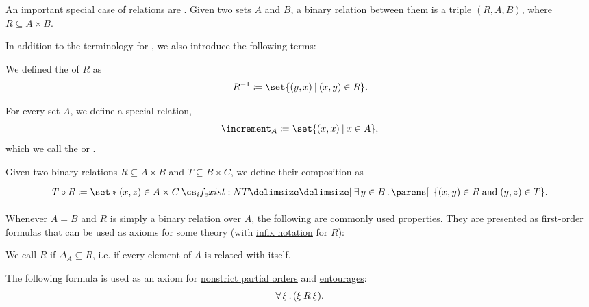 \begin{definition}\label{def:binary_relation}
  An important special case of \hyperref[def:relation]{relations} are . Given two sets \( A \) and \( B \), a binary relation between them is a triple \( (R, A, B) \), where \( R \subseteq A \times B \).

  In addition to the terminology for , we also introduce the following terms:
  \begin{thmenum}[series=def:binary_relation]
     We defined the  of \( R \) as
    \begin{equation*}
      R^{-1} \coloneqq \set{ (y, x) \given (x, y) \in R }.
    \end{equation*}

     For every set \( A \), we define a special relation,
    \begin{equation*}
      \increment_A \coloneqq \set{ (x, x) \given x \in A },
    \end{equation*}
    which we call the  or .

     Given two binary relations \( R \subseteq A \times B \) and \( T \subseteq B \times C \), we define their composition as
    \begin{equation*}
      T \bincirc R \coloneqq \set*{ (x, z) \in A \times C \given* \qexists {y \in B} \parens[\Big]{ (x, y) \in R \T{and} (y, z) \in T } }.
    \end{equation*}
  \end{thmenum}

  Whenever \( A = B \) and \( R \) is simply a binary relation over \( A \), the following are commonly used properties. They are presented as first-order formulas that can be used as axioms for some theory (with \hyperref[rem:first_order_formula_conventions/infix]{infix notation} for \( R \)):
  \begin{thmenum}[resume=def:binary_relation]
     We call \( R \)  if \( \Delta_A \subseteq R \), i.e. if every element of \( A \) is related with itself.

    The following formula is used as an axiom for \hyperref[thm:strict_partial_order]{nonstrict partial orders} and \hyperref[def:entourage]{entourages}:
    \begin{equation}\label{eq:def:binary_relation/reflexive}
      \forall \thinspace \xi \thinspace . \thinspace (\xi \mathbin{R} \xi).
    \end{equation}


\end{thmenum}
\end{definition}

